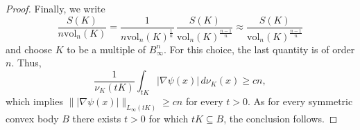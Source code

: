 \documentclass[10pt,a4paper]{amsart}
\newcommand{\gr}{\geqslant}
\newcommand{\vol}{\mathrm{vol}}
\begin{document}
\begin{proof}
Finally, we write 
$$\frac{S(K)}{n\vol_n(K)}=\frac{1}{n\vol_n(K)^{\frac{1}{n}}}\,\frac{S(K)}{\vol_n(K)^{\frac{n-1}{n}}}\approx \frac{S(K)}{\vol_n(K)^{\frac{n-1}{n}}}$$
and choose $K$ to be a multiple of $B_{\infty}^n$. For this choice, the last quantity is of order $n$. Thus,
$$\frac{1}{\nu_K(tK)}\int_{tK}|\nabla \psi(x)|\,d\nu_K(x)\gr cn,$$ which implies $\||\nabla\psi(x)|\|_{L_\infty(tK)}\gr cn$ for every $t>0$. As for every symmetric convex body $B$ there exists $t>0$ for which $tK\subseteq B$, the conclusion follows.
\end{proof}
\end{document}
